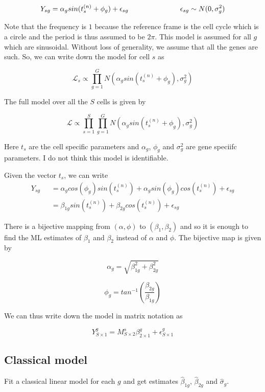 \documentclass[11pt]{article}
\begin{document}
$$ Y_{sg} = \alpha_g sin (t^{(n)}_s + \phi_g) + \epsilon_{sg}  \hspace{1 in}  \epsilon_{sg} \sim N(0, \sigma^2_{g}) $$

Note that the frequency is $1$ because the reference frame is the cell cycle which is a circle and the period is thus assumed to be $2 \pi$. This model is assumed for all $g$ which are sinusoidal. Without loss of generality, we assume that all the genes are such. So, we can write down the model  for cell $s$ as 

$$ \mathcal{L}_{s}  \propto \prod_{g=1}^{G} N \left ( \alpha_g sin (t^{(n)}_s + \phi_g), \sigma^2_{g} \right )  $$

The full model over all the $S$ cells is given by 

$$ \mathcal{L} \propto \prod_{s=1}^{S} \prod_{g=1}^{G} N \left ( \alpha_g sin (t^{(n)}_s + \phi_g), \sigma^2_{g} \right ) $$

Here $t_s$ are the cell specific parameters and $\alpha_g$, $\phi_g$ and $\sigma^2_g$ are gene speciifc parameters. I do not think this model is identifiable. 

Given the vector $t_s$, we can write 
\begin{align*}
Y_{sg}  & = \alpha_g  cos(\phi_g) sin (t^{(n)}_s) + \alpha_g sin (\phi_g) cos(t^{(n)}_s) + \epsilon_{sg}   \\
\qquad & = \beta_{1g} sin(t^{(n)}_s) + \beta_{2g} cos(t^{(n)}_s) + \epsilon_{sg}  
\end{align*}



There is a bijective mapping from $(\alpha,\phi)$ to $(\beta_1, \beta_2)$ and so it is enough to find the ML estimates of $\beta_1$ and $\beta_2$ instead of $\alpha$ and $\phi$. The bijective map is given by 

$$ \alpha_g = \sqrt{\beta^2_{1g} + \beta^2_{2g} }$$

$$ \phi_g = tan^{-1}  \left (\frac{\beta_{2g}}{\beta_{1g}} \right ) $$

We can thus write down the model in matrix notation as 

$$ Y^{g}_{S \times 1} = M^{s}_{S \times 2}  \beta^{g}_{2 \times 1} + \epsilon^{g}_{S \times 1} $$

\subsection{Classical model}

Fit a classical linear model for each $g$ and get estimates $\hat{\beta}_{1g}$, $\hat{\beta}_{2g}$ and $\hat{\sigma}_{g}$. 
\end{document}
